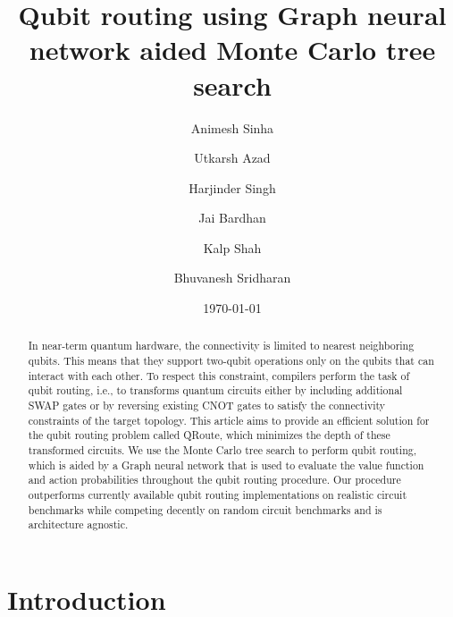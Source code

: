 \documentclass[%
 reprint,
 amsmath,amssymb,
 aps,
]{revtex4-2}
\begin{document}

\title{Qubit routing using Graph neural network aided Monte Carlo tree search}

\author{Animesh Sinha}
\author{Utkarsh Azad}
\author{Harjinder Singh}

\author{Jai Bardhan}
\author{Kalp Shah}
\author{Bhuvanesh Sridharan}
%

\date{\today}%

\begin{abstract}
In near-term quantum hardware, the connectivity is limited to nearest neighboring qubits. This means that they support two-qubit operations only on the qubits that can interact with each other. To respect this constraint, compilers perform the task of qubit routing, i.e., to transforms quantum circuits either by including additional SWAP gates or by reversing existing CNOT gates to satisfy the connectivity constraints of the target topology. This article aims to provide an efficient solution for the qubit routing problem called QRoute, which minimizes the depth of these transformed circuits. We use the Monte Carlo tree search to perform qubit routing, which is aided by a Graph neural network that is used to evaluate the value function and action probabilities throughout the qubit routing procedure. Our procedure outperforms currently available qubit routing implementations on realistic circuit benchmarks while competing decently on random circuit benchmarks and is architecture agnostic.
\end{abstract}

\maketitle


\section{\label{sec:intro}Introduction}
\end{document}
